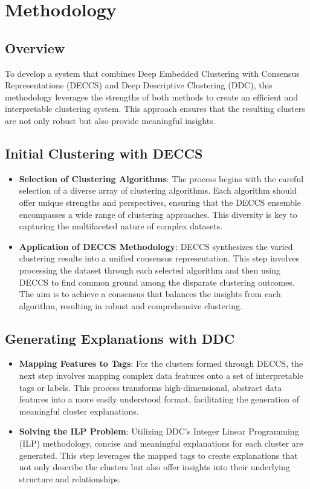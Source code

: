 \chapter{Methodology}

\section{Overview}
To develop a system that combines Deep Embedded Clustering with Consensus Representations (DECCS) and Deep Descriptive Clustering (DDC), this methodology leverages the strengths of both methods to create an efficient and interpretable clustering system. This approach ensures that the resulting clusters are not only robust but also provide meaningful insights.

\section{Initial Clustering with DECCS}
\begin{itemize}
    \item \textbf{Selection of Clustering Algorithms}: The process begins with the careful selection of a diverse array of clustering algorithms. Each algorithm should offer unique strengths and perspectives, ensuring that the DECCS ensemble encompasses a wide range of clustering approaches. This diversity is key to capturing the multifaceted nature of complex datasets.
    \item \textbf{Application of DECCS Methodology}: DECCS synthesizes the varied clustering results into a unified consensus representation. This step involves processing the dataset through each selected algorithm and then using DECCS to find common ground among the disparate clustering outcomes. The aim is to achieve a consensus that balances the insights from each algorithm, resulting in robust and comprehensive clustering.
\end{itemize}

\section{Generating Explanations with DDC}
\begin{itemize}
    \item \textbf{Mapping Features to Tags}: For the clusters formed through DECCS, the next step involves mapping complex data features onto a set of interpretable tags or labels. This process transforms high-dimensional, abstract data features into a more easily understood format, facilitating the generation of meaningful cluster explanations.
    \item \textbf{Solving the ILP Problem}: Utilizing DDC’s Integer Linear Programming (ILP) methodology, concise and meaningful explanations for each cluster are generated. This step leverages the mapped tags to create explanations that not only describe the clusters but also offer insights into their underlying structure and relationships.
\end{itemize}

